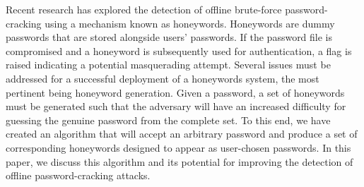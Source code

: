 Recent research has explored the detection of offline brute-force password-cracking using a mechanism known as honeywords. Honeywords are dummy passwords that are stored alongside users' passwords. If the password file is compromised and a honeyword is subsequently used for authentication, a flag is raised indicating a potential masquerading attempt. Several issues must be addressed for a successful deployment of a honeywords system, the most pertinent being honeyword generation. Given a password, a set of honeywords must be generated such that the adversary will have an increased difficulty for guessing the genuine password from the complete set. To this end, we have created an algorithm that will accept an arbitrary password and produce a set of corresponding honeywords designed to appear as user-chosen passwords. In this paper, we discuss this algorithm and its potential for improving the detection of offline password-cracking attacks.\\

